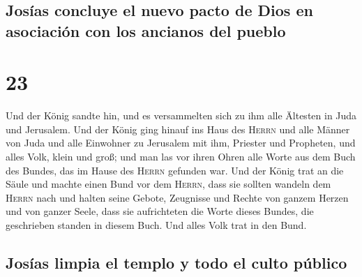 \hypertarget{josuxedas-concluye-el-nuevo-pacto-de-dios-en-asociaciuxf3n-con-los-ancianos-del-pueblo}{%
\subsection{Josías concluye el nuevo pacto de Dios en asociación con los
ancianos del
pueblo}\label{josuxedas-concluye-el-nuevo-pacto-de-dios-en-asociaciuxf3n-con-los-ancianos-del-pueblo}}

\hypertarget{section-22}{%
\section{23}\label{section-22}}

 Und der König sandte hin, und es versammelten sich zu ihm
alle Ältesten in Juda und Jerusalem.  Und der König ging
hinauf ins Haus des \textsc{Herrn} und alle Männer von Juda und alle
Einwohner zu Jerusalem mit ihm, Priester und Propheten, und alles Volk,
klein und groß; und man las vor ihren Ohren alle Worte aus dem Buch des
Bundes, das im Hause des \textsc{Herrn} gefunden war.  Und
der König trat an die Säule und machte einen Bund vor dem
\textsc{Herrn}, dass sie sollten wandeln dem \textsc{Herrn} nach und
halten seine Gebote, Zeugnisse und Rechte von ganzem Herzen und von
ganzer Seele, dass sie aufrichteten die Worte dieses Bundes, die
geschrieben standen in diesem Buch. Und alles Volk trat in den Bund.

\hypertarget{josuxedas-limpia-el-templo-y-todo-el-culto-puxfablico}{%
\subsection{Josías limpia el templo y todo el culto
público}\label{josuxedas-limpia-el-templo-y-todo-el-culto-puxfablico}}

